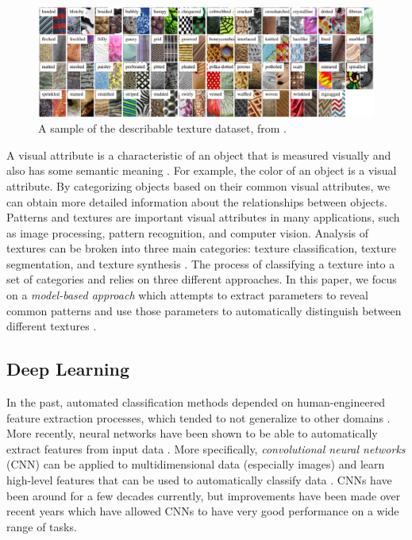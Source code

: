 \documentclass[12pt]{article}
\begin{document}
\begin{figure}[h]
    \centering
    \includegraphics[width=1\textwidth]{assets/images/texturedataset.png}
    \caption{A sample of the describable texture dataset, from
        \citeauthor*{cimpoi_describing_2014} \cite{cimpoi_describing_2014}. }
    \label{fig:texturedataset}
\end{figure}

A visual attribute is a characteristic of an object that is measured visually
and also has some semantic meaning \cite{cimpoi_describing_2014}. For example,
the color of an object is a visual attribute. By categorizing objects based on
their common visual attributes, we can obtain more detailed information about
the relationships between objects. Patterns and textures are important visual
attributes in many applications, such as image processing, pattern recognition,
and computer vision. Analysis of textures can be broken into three main
categories: texture classification, texture segmentation, and texture synthesis
\cite{reed_review_1993}. The process of classifying a texture into a set of
categories and relies on three different approaches. In this paper, we focus on
a \textit{model-based approach} which attempts to extract parameters to reveal
common patterns and use those parameters to automatically distinguish between
different textures \cite{maillard_texture_2003}.

\subsection{Deep Learning}

In the past, automated classification methods depended on human-engineered
feature extraction processes, which tended to not generalize to other domains
\cite{duda_pattern_2001}. More recently, neural networks have been shown to be
able to automatically extract features from input data \cite{arel_deep_2010}.
More specifically, \textit{convolutional neural networks} (CNN) can be applied
to multidimensional data (especially images) and learn high-level features that
can be used to automatically classify data \cite{lecun_gradient_1998}. CNNs have
been around for a few decades currently, but improvements have been made over
recent years which have allowed CNNs to have very good performance on a wide
range of tasks.
\end{document}
